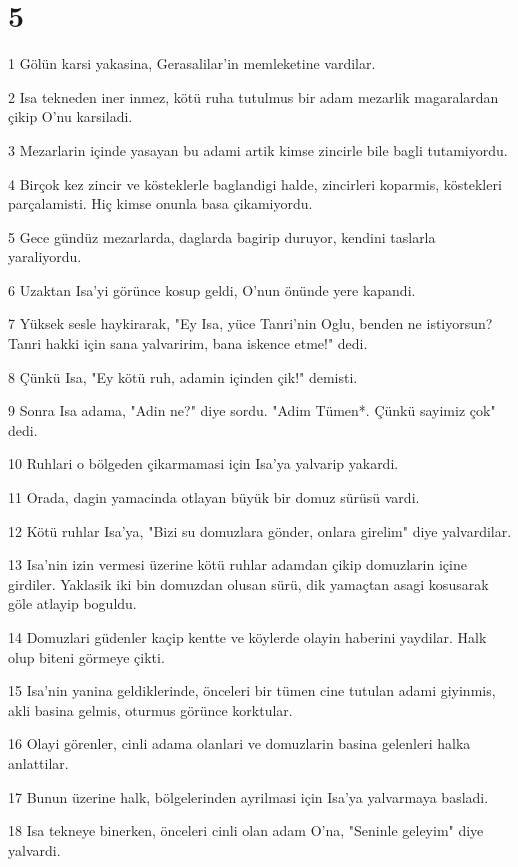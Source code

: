 \chapter{5}

\par 1 Gölün karsi yakasina, Gerasalilar'in memleketine vardilar.
\par 2 Isa tekneden iner inmez, kötü ruha tutulmus bir adam mezarlik magaralardan çikip O'nu karsiladi.
\par 3 Mezarlarin içinde yasayan bu adami artik kimse zincirle bile bagli tutamiyordu.
\par 4 Birçok kez zincir ve kösteklerle baglandigi halde, zincirleri koparmis, köstekleri parçalamisti. Hiç kimse onunla basa çikamiyordu.
\par 5 Gece gündüz mezarlarda, daglarda bagirip duruyor, kendini taslarla yaraliyordu.
\par 6 Uzaktan Isa'yi görünce kosup geldi, O'nun önünde yere kapandi.
\par 7 Yüksek sesle haykirarak, "Ey Isa, yüce Tanri'nin Oglu, benden ne istiyorsun? Tanri hakki için sana yalvaririm, bana iskence etme!" dedi.
\par 8 Çünkü Isa, "Ey kötü ruh, adamin içinden çik!" demisti.
\par 9 Sonra Isa adama, "Adin ne?" diye sordu. "Adim Tümen*. Çünkü sayimiz çok" dedi.
\par 10 Ruhlari o bölgeden çikarmamasi için Isa'ya yalvarip yakardi.
\par 11 Orada, dagin yamacinda otlayan büyük bir domuz sürüsü vardi.
\par 12 Kötü ruhlar Isa'ya, "Bizi su domuzlara gönder, onlara girelim" diye yalvardilar.
\par 13 Isa'nin izin vermesi üzerine kötü ruhlar adamdan çikip domuzlarin içine girdiler. Yaklasik iki bin domuzdan olusan sürü, dik yamaçtan asagi kosusarak göle atlayip boguldu.
\par 14 Domuzlari güdenler kaçip kentte ve köylerde olayin haberini yaydilar. Halk olup biteni görmeye çikti.
\par 15 Isa'nin yanina geldiklerinde, önceleri bir tümen cine tutulan adami giyinmis, akli basina gelmis, oturmus görünce korktular.
\par 16 Olayi görenler, cinli adama olanlari ve domuzlarin basina gelenleri halka anlattilar.
\par 17 Bunun üzerine halk, bölgelerinden ayrilmasi için Isa'ya yalvarmaya basladi.
\par 18 Isa tekneye binerken, önceleri cinli olan adam O'na, "Seninle geleyim" diye yalvardi.
